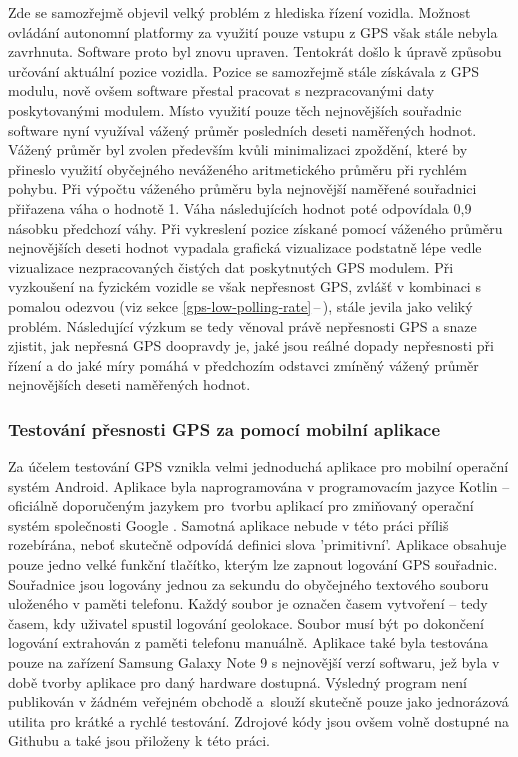 \documentclass[czech, bachelor]{diploma}
\newcommand{\peteref}[1]{\ref{#1}\,--\,\nameref{#1}}
\begin{document}
Zde se samozřejmě objevil velký problém z hlediska řízení vozidla. Možnost ovládání autonomní platformy za využití pouze vstupu
z GPS však stále nebyla zavrhnuta. Software proto byl znovu upraven. Tentokrát došlo k úpravě způsobu určování aktuální pozice
vozidla. Pozice se samozřejmě stále získávala z GPS modulu, nově ovšem software přestal pracovat s nezpracovanými daty
poskytovanými modulem. Místo využití pouze těch nejnovějších souřadnic software nyní využíval vážený průměr posledních deseti
naměřených hodnot. Vážený průměr byl zvolen především kvůli minimalizaci zpoždění, které by přineslo využití obyčejného neváženého
aritmetického průměru při rychlém pohybu. Při výpočtu váženého průměru byla nejnovější naměřené souřadnici přiřazena váha
o hodnotě 1. Váha následujících hodnot poté odpovídala 0,9 násobku předchozí váhy. Při vykreslení pozice získané pomocí váženého
průměru nejnovějších deseti hodnot vypadala grafická vizualizace podstatně lépe vedle vizualizace nezpracovaných čistých dat
poskytnutých GPS modulem. Při vyzkoušení na fyzickém vozidle se však nepřesnost GPS, zvlášť v kombinaci s pomalou odezvou (viz
sekce \peteref{gps-low-polling-rate}), stále jevila jako veliký problém. Následující výzkum se tedy věnoval právě nepřesnosti GPS
a snaze zjistit, jak nepřesná GPS doopravdy je, jaké jsou reálné dopady nepřesnosti při řízení a do jaké míry pomáhá v předchozím
odstavci zmíněný vážený průměr nejnovějších deseti naměřených hodnot.

\subsubsection{Testování přesnosti GPS za pomocí mobilní aplikace}

Za účelem testování GPS vznikla velmi jednoduchá aplikace pro mobilní operační systém Android. Aplikace byla naprogramována
v programovacím jazyce Kotlin -- oficiálně doporučeným jazykem pro~tvorbu aplikací pro zmiňovaný operační systém společnosti
Google \cite{kotlin-android-source}. Samotná aplikace nebude v této práci příliš rozebírána, neboť skutečně odpovídá definici
slova 'primitivní'. Aplikace obsahuje pouze jedno velké funkční tlačítko, kterým lze zapnout logování GPS souřadnic. Souřadnice
jsou logovány jednou za sekundu do obyčejného textového souboru uloženého v paměti telefonu. Každý soubor je označen časem
vytvoření -- tedy časem, kdy uživatel spustil logování geolokace. Soubor musí být po dokončení logování extrahován z paměti
telefonu manuálně. Aplikace také byla testována pouze na zařízení Samsung Galaxy Note 9 s nejnovější verzí softwaru, jež byla
v době tvorby aplikace pro daný hardware dostupná. Výsledný program není publikován v žádném veřejném obchodě a~slouží skutečně
pouze jako jednorázová utilita pro krátké a rychlé testování. Zdrojové kódy jsou ovšem volně dostupné na Githubu
\cite{geologger-source} a také jsou přiloženy k této práci.
\end{document}
